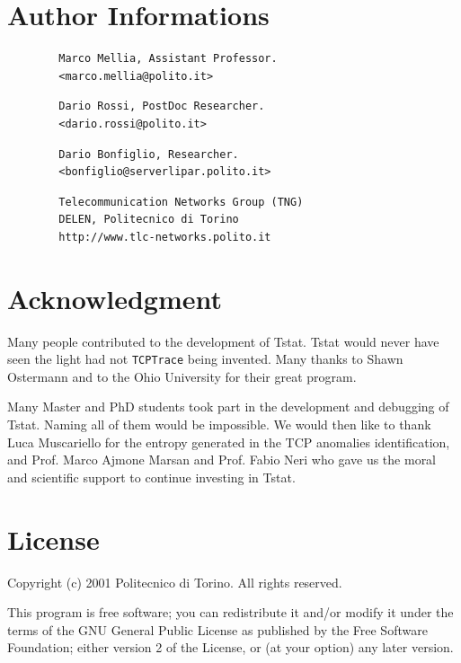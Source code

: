 \documentclass[11pt]{article}
\newcommand{\printindex}[0]{} %
\begin{document}
\section{Author Informations\label{Author_Informations}}
\begin{small}\begin{verbatim}
        Marco Mellia, Assistant Professor.
        <marco.mellia@polito.it>
\end{verbatim}\end{small} \noindent
\begin{small}\begin{verbatim}
        Dario Rossi, PostDoc Researcher.
        <dario.rossi@polito.it>
\end{verbatim}\end{small} \noindent
\begin{small}\begin{verbatim}
        Dario Bonfiglio, Researcher.
        <bonfiglio@serverlipar.polito.it>
\end{verbatim}\end{small} \noindent
\begin{small}\begin{verbatim}
        Telecommunication Networks Group (TNG)
        DELEN, Politecnico di Torino
        http://www.tlc-networks.polito.it
\end{verbatim}\end{small} \noindent
\section{Acknowledgment\label{Acknowledgment}}


Many people contributed to the development of Tstat. Tstat would never have seen
the light had not \texttt{TCPTrace} being invented.
Many thanks to Shawn Ostermann and to the  Ohio
University for their great program.



Many Master and PhD students took part in the development and debugging of
Tstat. Naming all of them would be impossible. We would then like to thank Luca
Muscariello for the entropy generated in the TCP
anomalies identification, and Prof. Marco Ajmone Marsan and 
Prof. Fabio Neri who gave us the moral and scientific support to 
continue investing in Tstat.

\section{License\label{License}}


Copyright (c) 2001 Politecnico di Torino.  All rights reserved.



This program is free software; you can redistribute it and/or modify
it under the terms of the GNU General Public License as published by
the Free Software Foundation; either version 2 of the License, or
(at your option) any later version.

\printindex
\end{document}
